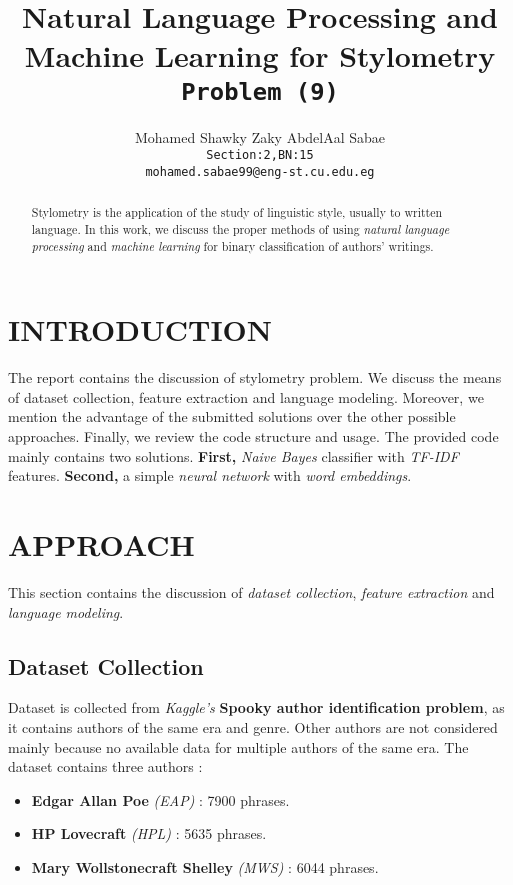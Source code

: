 \documentclass[letterpaper, 10 pt, conference]{ieeeconf}  %
\title{\LARGE \bf
Natural Language Processing and Machine Learning for Stylometry\\
\texttt{Problem (9)}
}
\author{
  Mohamed Shawky Zaky AbdelAal Sabae\\
  \texttt{Section:2,BN:15}\\
  \texttt{mohamed.sabae99@eng-st.cu.edu.eg}
}
\begin{document}
\maketitle
\thispagestyle{empty}
\pagestyle{empty}

\begin{abstract}
Stylometry is the application of the study of linguistic style, usually to written language. In this work, we discuss the proper methods of using \emph{natural language processing} and \emph{machine learning} for binary classification of authors' writings.
\end{abstract}

\section{INTRODUCTION}
The report contains the discussion of stylometry problem. We discuss the means of dataset collection, feature extraction and language modeling. Moreover, we mention the advantage of the submitted solutions over the other possible approaches. Finally, we review the code structure  and usage. The provided code mainly contains two solutions. \textbf{First,} \emph{Naive Bayes} classifier with \emph{TF-IDF} features. \textbf{Second,} a simple \emph{neural network} with \emph{word embeddings}.

\section{APPROACH}
This section contains the discussion of \emph{dataset collection}, \emph{feature extraction} and \emph{language modeling}.

\subsection{Dataset Collection}
Dataset is collected from \emph{Kaggle's} \textbf{Spooky author identification problem}, as it contains authors of the same era and genre. Other authors are not considered mainly because no available data for multiple authors of the same era. The dataset contains three authors :
\begin{itemize}
    \item \textbf{Edgar Allan Poe} \emph{(EAP)} : 7900 phrases.
    \item \textbf{HP Lovecraft} \emph{(HPL)} : 5635 phrases.
    \item \textbf{Mary Wollstonecraft Shelley} \emph{(MWS)} : 6044 phrases.
\end{itemize}
\end{document}
